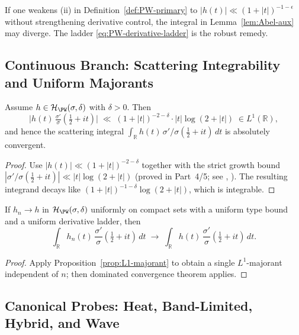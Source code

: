 \begin{remark} %
If one weakens (ii) in Definition~\ref{def:PW-primary} to $|h(t)|\ll (1+|t|)^{-1-\epsilon}$ without strengthening derivative control, the integral in Lemma~\ref{lem:Abel-aux} may diverge. The ladder \eqref{eq:PW-derivative-ladder} is the robust remedy. %
\end{remark}

\subsection{Continuous Branch: Scattering Integrability and Uniform Majorants} \label{subsec:scattering-integrability} %

\begin{proposition} \label{prop:L1-majorant} %
Assume $h\in\mathcal{H}_{\PW}(\sigma,\delta)$ with $\delta>0$. Then
\[
  \big|h(t)\,\tfrac{\sigma'}{\sigma}(\tfrac12+it)\big|
  \;\ll\; (1+|t|)^{-2-\delta}\cdot |t|\log(2+|t|)
  \;\in L^1(\mathbb R), %
\]
and hence the scattering integral $\int_{\mathbb R} h(t)\,\sigma'/\sigma(\tfrac12+it)\,dt$ is absolutely convergent. %
\end{proposition}

\begin{proof}
Use $|h(t)|\ll (1+|t|)^{-2-\delta}$ together with the strict growth bound $|\sigma'/\sigma(\tfrac12+it)|\ll |t|\log(2+|t|)$ (proved in Part~4/5; see \cite[Ch.~9]{IwaniecSpectral}, \cite{HejhalII}). The resulting integrand decays like $(1+|t|)^{-1-\delta}\log(2+|t|)$, which is integrable. %
\end{proof}

\begin{corollary} \label{cor:DC-lock} %
If $h_n\to h$ in $\mathcal{H}_{\PW}(\sigma,\delta)$ uniformly on compact sets with a uniform type bound and a uniform derivative ladder, then
\[
  \int_{\mathbb R} h_n(t)\,\frac{\sigma'}{\sigma}(\tfrac12+it)\,dt \;\to\; \int_{\mathbb R} h(t)\,\frac{\sigma'}{\sigma}(\tfrac12+it)\,dt. %
\]
\end{corollary}

\begin{proof}
Apply Proposition~\ref{prop:L1-majorant} to obtain a single $L^1$-majorant independent of $n$; then dominated convergence theorem applies. %
\end{proof}

\subsection{Canonical Probes: Heat, Band-Limited, Hybrid, and Wave} \label{subsec:canonical-probes} \relax \hspace{0pt} %

